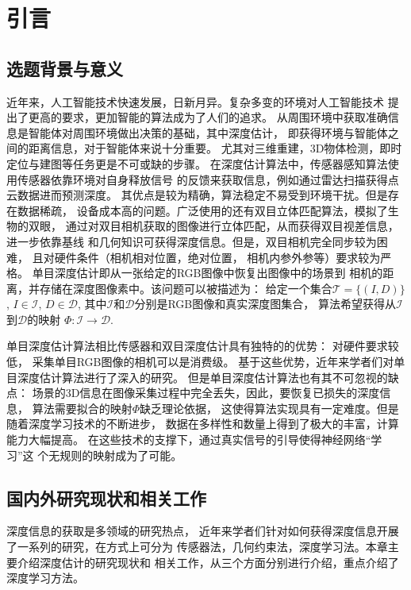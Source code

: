 \chapter{引言}
\label{cha:introduction}
\section{选题背景与意义}
\label{sec:background}
近年来，人工智能技术快速发展，日新月异。复杂多变的环境对人工智能技术
提出了更高的要求，更加智能的算法成为了人们的追求。
从周围环境中获取准确信息是智能体对周围环境做出决策的基础，其中深度估计，
即获得环境与智能体之间的距离信息，对于智能体来说十分重要。
尤其对三维重建，3D物体检测，即时定位与建图等任务更是不可或缺的步骤。
在深度估计算法中，传感器感知算法使用传感器依靠环境对自身释放信号
的反馈来获取信息，例如通过雷达扫描获得点云数据进而预测深度。
其优点是较为精确，算法稳定不易受到环境干扰。但是存在数据稀疏，
设备成本高的问题。广泛使用的还有双目立体匹配算法，模拟了生物的双眼，
通过对双目相机获取的图像进行立体匹配，从而获得双目视差信息，进一步依靠基线
和几何知识可获得深度信息。但是，双目相机完全同步较为困难，
且对硬件条件（相机相对位置，绝对位置，
相机内参外参等）要求较为严格。
单目深度估计即从一张给定的RGB图像中恢复出图像中的场景到
相机的距离，并存储在深度图像素中。该问题可以被描述为：
给定一个集合$\mathcal{T} = \{(I,D)\}$, 
$I\in \mathcal{I}$, $D\in \mathcal{D}$,
其中$\mathcal{I}$和$\mathcal{D}$分别是RGB图像和真实深度图集合，
算法希望获得从$\mathcal{I}$到$\mathcal{D}$的映射
$\varPhi : \mathcal{I} \rightarrow \mathcal{D}$. 

单目深度估计算法相比传感器和双目深度估计具有独特的的优势：
对硬件要求较低，
采集单目RGB图像的相机可以是消费级。
基于这些优势，近年来学者们对单目深度估计算法进行了深入的研究。
但是单目深度估计算法也有其不可忽视的缺点：
场景的3D信息在图像采集过程中完全丢失，因此，要恢复已损失的深度信息，
算法需要拟合的映射$\varPhi$缺乏理论依据，
这使得算法实现具有一定难度。但是随着深度学习技术的不断进步，
数据在多样性和数量上得到了极大的丰富，计算能力大幅提高。
在这些技术的支撑下，通过真实信号的引导使得神经网络“学习”这
个无规则的映射成为了可能。

\section{国内外研究现状和相关工作}
深度信息的获取是多领域的研究热点，
近年来学者们针对如何获得深度信息开展了一系列的研究，在方式上可分为
传感器法，几何约束法，深度学习法。本章主要介绍深度估计的研究现状和
相关工作，从三个方面分别进行介绍，重点介绍了深度学习方法。


